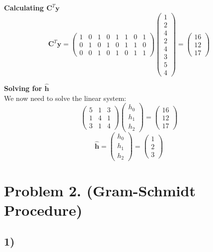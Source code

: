 \documentclass{article}
\newcommand{\0}{{\mathbf{0}}} %
\newcommand{\vect}[1]{\mathbf{#1}}
\begin{document}
\textbf{Calculating $\mathbf{C}^T \vect{y}$}
\[
\mathbf{C}^T \vect{y} =
\begin{pmatrix}
1 & 0 & 1 & 0 & 1 & 1 & 0 & 1 \\
0 & 1 & 0 & 1 & 0 & 1 & 1 & 0 \\
0 & 0 & 1 & 0 & 1 & 0 & 1 & 1
\end{pmatrix}
\begin{pmatrix}
1 \\ 2 \\ 4 \\ 2 \\ 4 \\ 3 \\ 5 \\ 4
\end{pmatrix}
=
\begin{pmatrix}
16 \\
12 \\
17
\end{pmatrix}
\]

\textbf{Solving for $\hat{\vect{h}}$} \\
We now need to solve the linear system:
\[
\begin{pmatrix}
5 & 1 & 3 \\
1 & 4 & 1 \\
3 & 1 & 4
\end{pmatrix}
\begin{pmatrix}
h_0 \\ h_1 \\ h_2
\end{pmatrix}
=
\begin{pmatrix}
16 \\
12 \\
17
\end{pmatrix}
\]
\[
\hat{\vect{h}} =
\begin{pmatrix} h_0 \\ h_1 \\ h_2
\end{pmatrix} =
\begin{pmatrix} 1 \\ 2 \\ 3
\end{pmatrix}
\]

\section*{Problem 2. (Gram-Schmidt Procedure) }
\subsection*{1)}
\end{document}
